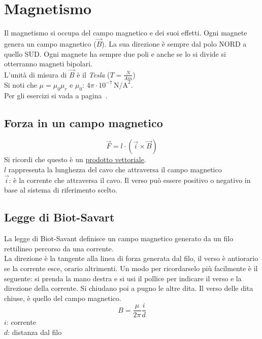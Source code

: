 
\section{Magnetismo}\label{sec:magnetismo}
Il magnetismo si occupa del campo magnetico e dei suoi effetti. Ogni magnete genera un
campo magnetico ($\vec{B}$). La sua direzione è sempre dal polo NORD a quello SUD. Ogni magnete ha
sempre due poli e anche se lo si divide si otterranno magneti bipolari.\\ 
L'unità di misura di $\vec{B}$ è il \emph{Tesla} ($T = \frac{N}{Am}$)\\
Si noti che $\mu = \mu_0\mu_r$ e \hyperref[tab:mu0]{$\mu_0$}: $4\pi\cdot10^{-7}\,\text{N/A}^2$.\\
Per gli esercizi si vada a pagina~\pageref{ex:magnetismo}.

\subsection{Forza in un campo magnetico}
\begin{equation*}	
\vec{F} = l\cdot(\vec{i}\times\vec{B})
\end{equation*}
Si ricordi che questo è un \hyperref[subsec:vettori:prodottoVettoriale]{prodotto vettoriale}.\\
$l$ rappresenta la lunghezza del cavo che attraversa il campo magnetico\\
$\vec{i}$: è la corrente che attraversa il cavo. Il verso può essere positivo o
negativo in base al sistema di riferimento scelto.

\subsection{Legge di Biot-Savart}
La legge di Biot-Savant definisce un campo magnetico generato da un filo rettilineo percorso da
una corrente.\\
La direzione è la tangente alla linea di forza generata dal filo, il verso è antiorario se la
corrente esce, orario altrimenti. Un modo per ricordarselo più facilmente è il seguente: si prenda la
mano destra e si usi il pollice per indicare il verso e la direzione della corrente. Si chiudano poi
a pugno le altre dita. Il verso delle dita chiuse, è quello del campo magnetico.
\begin{equation*}
  B = \frac{\mu}{2\pi}\frac{i}{d}
\end{equation*}
$i$: corrente\\
$d$: distanza dal filo\\ [\baselineskip]

